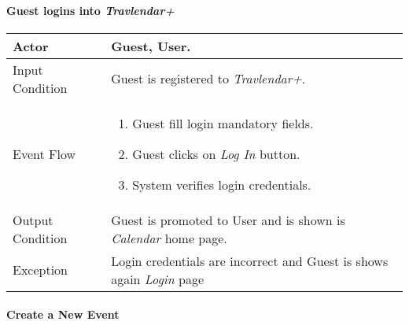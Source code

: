	\paragraph{Guest logins into \textit{Travlendar+}} \label{login_useCase}
	
		\begin{tabular}{| l | p{} | }
			\hline
			\hline
			Actor	&		Guest, User. \\
			\hline
			Input Condition		&		Guest is registered to  \textit{Travlendar+}. \\
			\hline
			Event Flow		&		\begin{enumerate}
												\item Guest fill login mandatory fields.
												\item Guest clicks on \textit{Log In} button.
												\item System verifies login credentials.
											\end{enumerate} \\
			\hline
			Output Condition		&		Guest is promoted to User and is shown is \textit{Calendar} home page. \\
			\hline		
			Exception		&		Login credentials are incorrect and Guest is shows again \textit{Login} page\\
			\hline
			\hline
		\end{tabular}

	\paragraph{Create a New Event} \label{createEvent_useCase}
	
